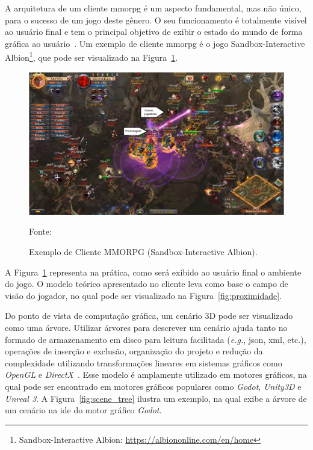 A arquitetura de um cliente \ac{mmorpg} é um aspecto fundamental, mas não único, para o sucesso de um jogo deste gênero.
%
O seu funcionamento é totalmente visível ao usuário final e tem o principal objetivo de exibir o estado do mundo de forma gráfica ao usuário~\cite{albion_online_unite}.
%
Um exemplo de cliente \ac{mmorpg} é o jogo Sandbox-Interactive Albion\footnote{Sandbox-Interactive Albion: \url{https://albiononline.com/en/home}}, que pode ser visualizado na Figura~\ref{fig:cliente_albion}.



\begin{figure}[htb!]
\caption{Exemplo de Cliente MMORPG (Sandbox-Interactive Albion).}
\label{fig:cliente_albion}
\includegraphics[width=\textwidth]{img/cap2/cliente_albion.png}
\centering

Fonte:~\cite{albion_online_unite}
\end{figure}

A Figura~\ref{fig:cliente_albion} representa na prática, como será exibido ao usuário final o ambiente do jogo.
%
O modelo teórico apresentado no cliente leva como base o campo de visão do jogador, no qual pode ser visualizado na Figura~\ref{fig:proximidade}.


Do ponto de vista de computação gráfica, um cenário 3D pode ser visualizado como uma árvore.
%
Utilizar árvores para descrever um cenário ajuda tanto no formado de armazenamento em disco para leitura facilitada (\textit{e.g.}, \ac{json}, \ac{xml}, etc.), operações de inserção e exclusão, organização do projeto e redução da complexidade utilizando transformações lineares em sistemas gráficos como \textit{OpenGL} e \textit{DirectX}~\cite{Lengyel2011Jun}.
%
Esse modelo é amplamente utilizado em motores gráficos, na qual pode ser encontrado em motores gráficos populares como \textit{Godot}, \textit{Unity3D} e \textit{Unreal 3}.
%
A Figura~\ref{fig:scene_tree} ilustra um exemplo, na qual exibe a árvore de um cenário na \ac{ide} do motor gráfico \textit{Godot}.



